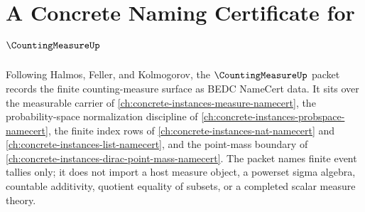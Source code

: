 \chapter{A Concrete Naming Certificate for $\CountingMeasureUp$}
\label{ch:concrete-instances-counting-measure-namecert}

Following Halmos, Feller, and Kolmogorov, the $\CountingMeasureUp$ packet records the finite counting-measure surface as BEDC NameCert data. It sits over the measurable carrier of \autoref{ch:concrete-instances-measure-namecert}, the probability-space normalization discipline of \autoref{ch:concrete-instances-probspace-namecert}, the finite index rows of \autoref{ch:concrete-instances-nat-namecert} and \autoref{ch:concrete-instances-list-namecert}, and the point-mass boundary of \autoref{ch:concrete-instances-dirac-point-mass-namecert}. The packet names finite event tallies only; it does not import a host measure object, a powerset sigma algebra, countable additivity, quotient equality of subsets, or a completed scalar measure theory.

